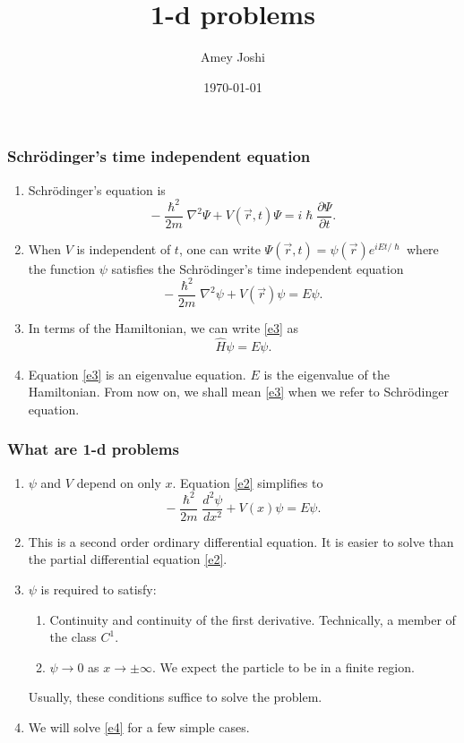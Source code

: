 \documentclass{beamer}
\title{1-d problems}
\author{Amey Joshi}
\date{\today}
\begin{document}
\begin{frame}
\titlepage
\end{frame}

\begin{frame}
\frametitle{Schr\"{o}dinger's time independent equation}
\begin{enumerate}
\item Schr\"{o}dinger's equation is
\begin{equation}\label{e1}
-\frac{\hslash^2}{2m}\nabla^2\Psi + V(\vec{r},t)\Psi = i\hslash
\frac{\partial\Psi}{\partial t}.
\end{equation}
\item When $V$ is independent of $t$, one can write $ \Psi(\vec{r}, t) = 
\psi(\vec{r})e^{iEt/\hslash}$ where the function $\psi$ satisfies the 
Schr\"{o}dinger's time independent equation
\begin{equation}\label{e2}
-\frac{\hslash^2}{2m}\nabla^2\psi + V(\vec{r})\psi = E\psi.
\end{equation}
\item In terms of the Hamiltonian, we can write \eqref{e3} as
\begin{equation}\label{e3}
\hat{H}\psi = E\psi.
\end{equation}
\item Equation \eqref{e3} is an eigenvalue equation. $E$ is the eigenvalue of
the Hamiltonian. From now on, we shall mean \eqref{e3} when we refer to 
Schr\"{o}dinger equation.
\end{enumerate}
\end{frame}

\begin{frame}
\frametitle{What are 1-d problems}
\begin{enumerate}
\item $\psi$ and $V$  depend on only $x$. Equation \eqref{e2} simplifies to
\begin{equation}\label{e4}
-\frac{\hslash^2}{2m}\frac{d^2\psi}{dx^2} + V(x)\psi = E\psi.
\end{equation}
\item This is a second order ordinary differential equation. It is easier to
solve than the partial differential equation \eqref{e2}.
\item $\psi$ is required to satisfy:
\begin{enumerate}
\item Continuity and continuity of the first derivative. Technically, a member
of the class $C^1$.
\item $\psi \rightarrow 0$ as $x \rightarrow \pm\infty$. We expect the particle
to be in a finite region.
\end{enumerate}
Usually, these conditions suffice to solve the problem.
\item We will solve \eqref{e4} for a few simple cases.
\end{enumerate}
\end{frame}
\end{document}
